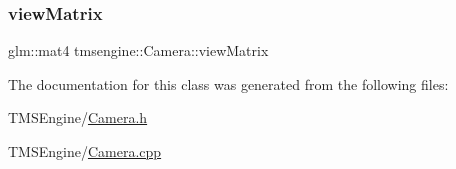 \subsubsection{\texorpdfstring{view\+Matrix}{viewMatrix}}
{\footnotesize\ttfamily glm\+::mat4 tmsengine\+::\+Camera\+::view\+Matrix\hspace{0.3cm}{\ttfamily [private]}}



The documentation for this class was generated from the following files\+:\begin{DoxyCompactItemize}
\item 
T\+M\+S\+Engine/\hyperlink{_camera_8h}{Camera.\+h}\item 
T\+M\+S\+Engine/\hyperlink{_camera_8cpp}{Camera.\+cpp}\end{DoxyCompactItemize}

